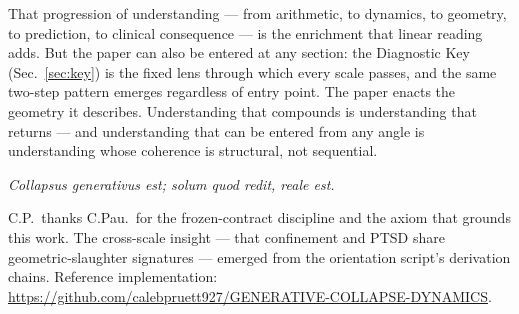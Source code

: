 \documentclass[
  aps,
  prd,
  twocolumn,
  superscriptaddress,
  nofootinbib,
  floatfix
]{revtex4-2}
\begin{document}
That progression of understanding --- from arithmetic, to
dynamics, to geometry, to prediction, to clinical
consequence --- is the enrichment that linear reading adds.
But the paper can also be entered at any section: the
Diagnostic Key (Sec.~\ref{sec:key}) is the fixed lens
through which every scale passes, and the same two-step
pattern emerges regardless of entry point.  The paper enacts
the geometry it describes.  Understanding that compounds is
understanding that returns --- and understanding that can
be entered from any angle is understanding whose coherence
is structural, not sequential.

\emph{Collapsus generativus est; solum quod redit, reale est.}

\begin{acknowledgments}
C.P.\ thanks C.Pau.\ for the frozen-contract discipline and
the axiom that grounds this work.  The cross-scale insight ---
that confinement and PTSD share geometric-slaughter
signatures --- emerged from the orientation script's
derivation chains.  Reference implementation:
\url{https://github.com/calebpruett927/GENERATIVE-COLLAPSE-DYNAMICS}.
\end{acknowledgments}


\end{document}
